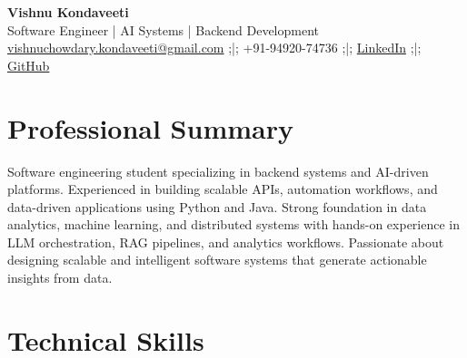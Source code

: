 \documentclass[10pt]{article}
\begin{document}
\begin{center}
{\LARGE \textbf{Vishnu Kondaveeti}} \\[4pt]
Software Engineer | AI Systems | Backend Development \\[4pt]
\href{mailto:vishnuchowdary.kondaveeti@gmail.com}{vishnuchowdary.kondaveeti@gmail.com} ;|;
+91-94920-74736 ;|;
\href{https://www.linkedin.com/in/vishnu-kondaveeti-7856502b4}{LinkedIn} ;|;
\href{https://github.com/VishnuKondaveeti}{GitHub}
\end{center}

\section*{Professional Summary}

Software engineering student specializing in backend systems and AI-driven platforms.
Experienced in building scalable APIs, automation workflows, and data-driven applications using Python and Java.
Strong foundation in data analytics, machine learning, and distributed systems with hands-on experience in
LLM orchestration, RAG pipelines, and analytics workflows. Passionate about designing scalable and intelligent
software systems that generate actionable insights from data.

\section*{Technical Skills}
\end{document}
